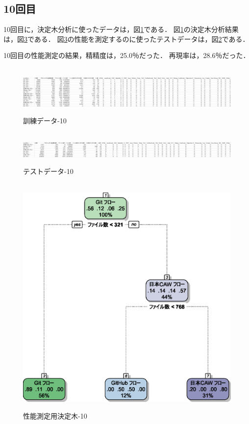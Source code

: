\subsection{10回目}
10回目に，決定木分析に使ったデータは，図\ref{データ10-1}である．
図\ref{データ10-1}の決定木分析結果は，図\ref{決定木10}である．
図\ref{決定木10}の性能を測定するのに使ったテストデータは，図\ref{データ10-2}である．

10回目の性能測定の結果，精精度は，25.0％だった．
再現率は，28.6％だった．

\begin{figure}[H]
\centering　
\includegraphics[width=13cm]{10-1.png}
\caption{訓練データ-10}\label{データ10-1}
\end{figure}
\begin{figure}[H]
\centering　
\includegraphics[width=13cm]{10-2.png}
\caption{テストデータ-10}\label{データ10-2}
\end{figure}
\begin{figure}[H]
\centering　
\includegraphics[width=13cm]{10.eps}
\caption{性能測定用決定木-10}\label{決定木10}
\end{figure}




